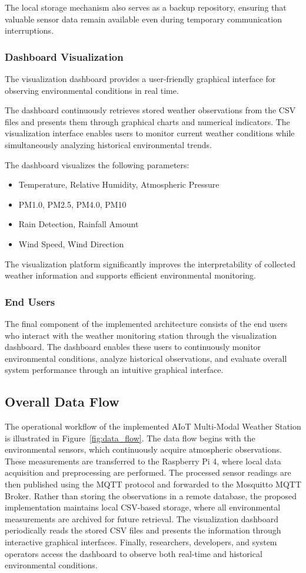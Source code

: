 \documentclass[12pt]{article}
\begin{document}
The local storage mechanism also serves as a backup repository, ensuring that valuable sensor data remain available even during temporary communication interruptions.

\subsubsection{Dashboard Visualization}
The visualization dashboard provides a user-friendly graphical interface for observing environmental conditions in real time.

The dashboard continuously retrieves stored weather observations from the CSV files and presents them through graphical charts and numerical indicators. The visualization interface enables users to monitor current weather conditions while simultaneously analyzing historical environmental trends.

The dashboard visualizes the following parameters:
\begin{itemize}
    \item Temperature, Relative Humidity, Atmospheric Pressure
    \item PM1.0, PM2.5, PM4.0, PM10
    \item Rain Detection, Rainfall Amount
    \item Wind Speed, Wind Direction
\end{itemize}
The visualization platform significantly improves the interpretability of collected weather information and supports efficient environmental monitoring.

\subsubsection{End Users}
The final component of the implemented architecture consists of the end users who interact with the weather monitoring station through the visualization dashboard. The dashboard enables these users to continuously monitor environmental conditions, analyze historical observations, and evaluate overall system performance through an intuitive graphical interface.

\subsection{Overall Data Flow}
The operational workflow of the implemented AIoT Multi-Modal Weather Station is illustrated in Figure~\ref{fig:data_flow}. The data flow begins with the environmental sensors, which continuously acquire atmospheric observations. These measurements are transferred to the Raspberry Pi 4, where local data acquisition and preprocessing are performed. The processed sensor readings are then published using the MQTT protocol and forwarded to the Mosquitto MQTT Broker. Rather than storing the observations in a remote database, the proposed implementation maintains local CSV-based storage, where all environmental measurements are archived for future retrieval. The visualization dashboard periodically reads the stored CSV files and presents the information through interactive graphical interfaces. Finally, researchers, developers, and system operators access the dashboard to observe both real-time and historical environmental conditions.
\end{document}
